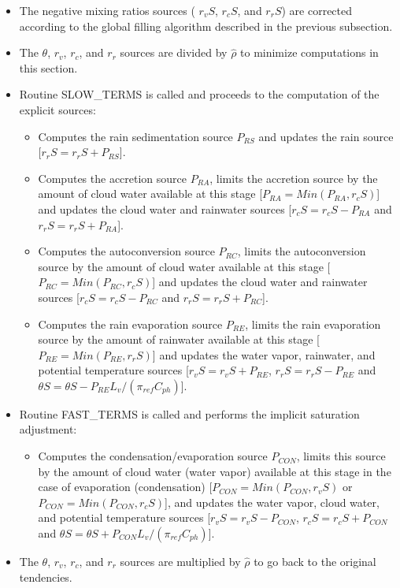 \begin{itemize}
\item
The negative mixing ratios sources ( $r_vS$, $r_cS$, and  $r_rS$)
are corrected according to the global filling algorithm described in the previous subsection.

\item
The  $\theta$, $r_v$, $r_c$, and $r_r$ sources are divided by $\hat \rho$
to minimize computations in this section.


\item
Routine SLOW\_TERMS is called and proceeds to the computation of the
explicit sources:

\begin{itemize}
\item
Computes the rain sedimentation source $P_{RS}$ and updates the rain
source [$r_r S = r_rS + P_{RS}$].

\item
Computes the  accretion source $P_{RA}$, limits the accretion source
by the amount of cloud water available at this stage
[$P_{RA} = Min (P_{RA}, r_cS)$] and updates the cloud water and rainwater
sources
[$r_c S = r_c S - P_{RA}$ and  $r_r S = r_r S + P_{RA}$].

\item
Computes the  autoconversion source $P_{RC}$, limits the autoconversion
source by the amount of cloud water available at this stage
[$P_{RC} = Min (P_{RC}, r_cS)$] and updates the cloud water and rainwater
sources
[$r_c S = r_c S - P_{RC}$ and  $r_r S = r_r S + P_{RC}$].

\item
Computes the  rain evaporation source $P_{RE}$, limits the rain
evaporation  source by the amount of rainwater available at this stage
[$P_{RE} = Min (P_{RE}, r_rS)$] and updates the water vapor, rainwater, and
potential temperature sources
[$r_v S = r_v S + P_{RE}$,  $r_r S = r_r S - P_{RE}$ and $\theta S = \theta S
- P_{RE} L_v / (\pi_{ref} C_{ph})$].
\end{itemize}

\item
Routine FAST\_TERMS is called and performs the implicit saturation
adjustment:

\begin{itemize}
\item
Computes the condensation/evaporation source $P_{CON}$, limits this
source by  the amount of cloud water (water vapor) available at this stage in
the case of evaporation (condensation) [$P_{CON} = Min (P_{CON}, r_vS)$
or $P_{CON} = Min (P_{CON}, r_cS)$], and updates  the water vapor,
cloud water, and potential temperature sources
[$r_v S = r_v S - P_{CON}$,  $r_c S = r_c S + P_{CON}$ and $\theta S = \theta S
+ P_{CON} L_v / (\pi_{ref} C_{ph})$].
\end{itemize}

\item
The  $\theta$, $r_v$, $r_c$, and $r_r$ sources are multiplied by $\hat \rho$
to go back to the original tendencies.
\end{itemize}


